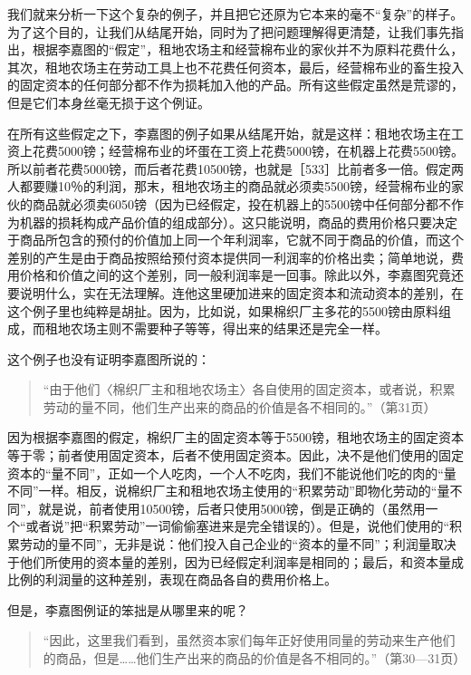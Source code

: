我们就来分析一下这个复杂的例子，并且把它还原为它本来的毫不“复杂”的样子。为了这个目的，让我们从结尾开始，同时为了把问题理解得更清楚，让我们事先指出，根据李嘉图的“假定”，租地农场主和经营棉布业的家伙并不为原料花费什么，其次，租地农场主在劳动工具上也不花费任何资本，最后，经营棉布业的畜生投入的固定资本的任何部分都不作为损耗加入他的产品。所有这些假定虽然是荒谬的，但是它们本身丝毫无损于这个例证。

在所有这些假定之下，李嘉图的例子如果从结尾开始，就是这样：租地农场主在工资上花费5000镑；经营棉布业的坏蛋在工资上花费5000镑，在机器上花费5500镑。所以前者花费5000镑，而后者花费10500镑，也就是［533］比前者多一倍。假定两人都要赚10％的利润，那末，租地农场主的商品就必须卖5500镑，经营棉布业的家伙的商品就必须卖6050镑（因为已经假定，投在机器上的5500镑中任何部分都不作为机器的损耗构成产品价值的组成部分）。这只能说明，商品的费用价格只要决定于商品所包含的预付的价值加上同一个年利润率，它就不同于商品的价值，而这个差别的产生是由于商品按照给预付资本提供同一利润率的价格出卖；简单地说，费用价格和价值之间的这个差别，同一般利润率是一回事。除此以外，李嘉图究竟还要说明什么，实在无法理解。连他这里硬加进来的固定资本和流动资本的差别，在这个例子里也纯粹是胡扯。因为，比如说，如果棉织厂主多花的5500镑由原料组成，而租地农场主则不需要种子等等，得出来的结果还是完全一样。

这个例子也没有证明李嘉图所说的：

\begin{quote}{“由于他们〈棉织厂主和租地农场主〉各自使用的固定资本，或者说，积累劳动的量不同，他们生产出来的商品的价值是各不相同的。”（第31页）}\end{quote}

因为根据李嘉图的假定，棉织厂主的固定资本等于5500镑，租地农场主的固定资本等于零；前者使用固定资本，后者不使用固定资本。因此，决不是他们使用的固定资本的“量不同”，正如一个人吃肉，一个人不吃肉，我们不能说他们吃的肉的“量不同”一样。相反，说棉织厂主和租地农场主使用的“积累劳动”即物化劳动的“量不同”，就是说，前者使用10500镑，后者只使用5000镑，倒是正确的（虽然用一个“或者说”把“积累劳动”一词偷偷塞进来是完全错误的）。但是，说他们使用的“积累劳动的量不同”，无非是说：他们投入自己企业的“资本的量不同”；利润量取决于他们所使用的资本量的差别，因为已经假定利润率是相同的；最后，和资本量成比例的利润量的这种差别，表现在商品各自的费用价格上。

但是，李嘉图例证的笨拙是从哪里来的呢？

\begin{quote}{“因此，这里我们看到，虽然资本家们每年正好使用同量的劳动来生产他们的商品，但是……他们生产出来的商品的价值是各不相同的。”（第30—31页）}\end{quote}

